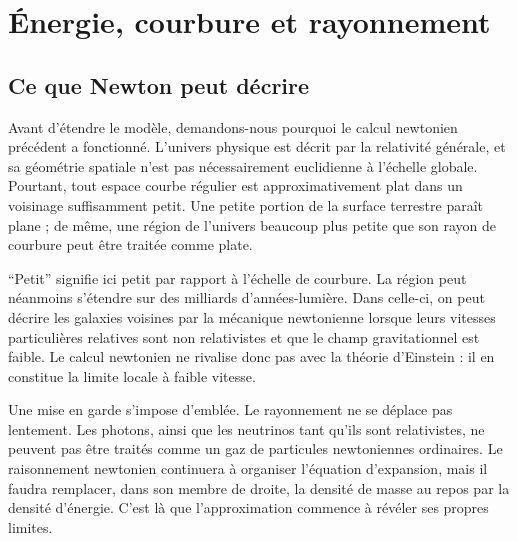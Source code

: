 \chapter{Énergie, courbure et rayonnement}


\section{Ce que Newton peut décrire}

Avant d’étendre le modèle, demandons-nous pourquoi le calcul newtonien précédent a fonctionné. L’univers physique est décrit par la relativité générale, et sa géométrie spatiale n’est pas nécessairement euclidienne à l’échelle globale. Pourtant, tout espace courbe régulier est approximativement plat dans un voisinage suffisamment petit. Une petite portion de la surface terrestre paraît plane ; de même, une région de l’univers beaucoup plus petite que son rayon de courbure peut être traitée comme plate.

``Petit'' signifie ici petit par rapport à l’échelle de courbure. La région peut néanmoins s’étendre sur des milliards d’années-lumière. Dans celle-ci, on peut décrire les galaxies voisines par la mécanique newtonienne lorsque leurs vitesses particulières relatives sont non relativistes et que le champ gravitationnel est faible. Le calcul newtonien ne rivalise donc pas avec la théorie d’Einstein : il en constitue la limite locale à faible vitesse.

Une mise en garde s’impose d’emblée. Le rayonnement ne se déplace pas lentement. Les photons, ainsi que les neutrinos tant qu’ils sont relativistes, ne peuvent pas être traités comme un gaz de particules newtoniennes ordinaires. Le raisonnement newtonien continuera à organiser l’équation d’expansion, mais il faudra remplacer, dans son membre de droite, la densité de masse au repos par la densité d’énergie. C’est là que l’approximation commence à révéler ses propres limites.

